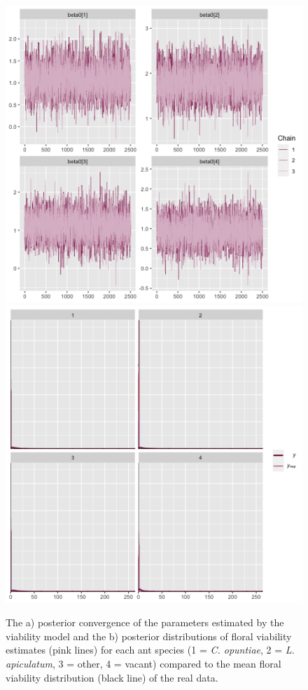 \documentclass[11pt]{article}
\begin{document}
\begin{figure}
	\includegraphics[width = 0.45\linewidth]{Figures/viab_conv.png}
	\includegraphics[width=0.45\linewidth]{Figures/viab_post.png}
	\caption{The a) posterior convergence of the parameters estimated by the viability model and the b) posterior distributions of floral viability estimates (pink lines) for each ant species (1 = \textit{C. opuntiae}, 2 = \textit{L. apiculatum}, 3 = other, 4 = vacant) compared to the mean floral viability distribution (black line) of the real data.}
	\label{fig:Viab_post}
\end{figure}
\end{document}
